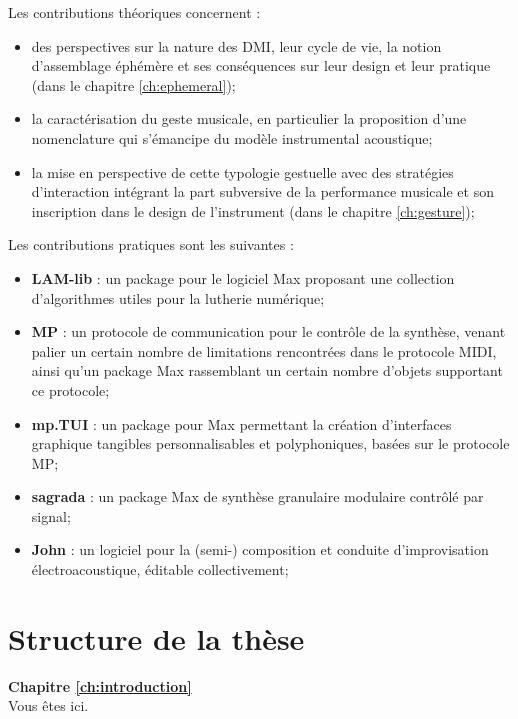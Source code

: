 Les contributions théoriques concernent :
\vspace{-1em}
\begin{itemize}[noitemsep]
\item des perspectives sur la nature des \gls{DMI}, leur cycle de vie, la notion d'assemblage éphémère et ses conséquences sur leur design et leur pratique (dans le chapitre \ref{ch:ephemeral});
\item la caractérisation du geste musicale, en particulier la proposition d'une nomenclature qui s'émancipe du modèle instrumental acoustique;
\item la mise en perspective de cette typologie gestuelle avec des stratégies d'interaction intégrant la part subversive de la performance musicale et son inscription dans le design de l'instrument (dans le chapitre \ref{ch:gesture});
\end{itemize}

Les contributions pratiques sont les suivantes :
\vspace{-1em}
\begin{itemize}[noitemsep]
\item \textbf{LAM-lib} : un package pour le logiciel Max proposant une collection d'algorithmes utiles pour la lutherie numérique;
\item \textbf{MP} : un protocole de communication pour le contrôle de la synthèse, venant palier un certain nombre de limitations rencontrées dans le protocole MIDI, ainsi qu'un package Max rassemblant un certain nombre d'objets supportant ce protocole;
\item \textbf{mp.TUI} : un package pour Max permettant la création d'interfaces graphique tangibles personnalisables et polyphoniques, basées sur le protocole MP;
\item \textbf{sagrada} : un package Max de synthèse granulaire modulaire contrôlé par signal;
\item \textbf{John} : un logiciel pour la (semi-) composition et conduite d'improvisation électroacoustique, éditable collectivement;
\end{itemize}


\section{Structure de la thèse}
\label{sec:preamble:structure}

\textbf{Chapitre \ref{ch:introduction}} \\[0.2em]
Vous êtes ici.

